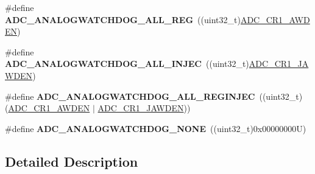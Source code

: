 \begin{DoxyCompactItemize}
\item 
\mbox{\label{group___a_d_c__analog__watchdog__selection_gad9d25140644089dd34084cb4dfa7ebd8}} 
\#define {\bfseries A\+D\+C\+\_\+\+A\+N\+A\+L\+O\+G\+W\+A\+T\+C\+H\+D\+O\+G\+\_\+\+A\+L\+L\+\_\+\+R\+EG}~((uint32\+\_\+t)\mbox{\hyperlink{group___peripheral___registers___bits___definition_ga6e006d43fcb9fe1306745c95a1bdd651}{A\+D\+C\+\_\+\+C\+R1\+\_\+\+A\+W\+D\+EN}})
\item 
\mbox{\label{group___a_d_c__analog__watchdog__selection_gacf2ee0d67e728fd6258270b239823713}} 
\#define {\bfseries A\+D\+C\+\_\+\+A\+N\+A\+L\+O\+G\+W\+A\+T\+C\+H\+D\+O\+G\+\_\+\+A\+L\+L\+\_\+\+I\+N\+J\+EC}~((uint32\+\_\+t)\mbox{\hyperlink{group___peripheral___registers___bits___definition_ga4886de74bcd3a1e545094089f76fd0b3}{A\+D\+C\+\_\+\+C\+R1\+\_\+\+J\+A\+W\+D\+EN}})
\item 
\mbox{\label{group___a_d_c__analog__watchdog__selection_ga8ab72f0e7dfee943acb5cccacff7e4a0}} 
\#define {\bfseries A\+D\+C\+\_\+\+A\+N\+A\+L\+O\+G\+W\+A\+T\+C\+H\+D\+O\+G\+\_\+\+A\+L\+L\+\_\+\+R\+E\+G\+I\+N\+J\+EC}~((uint32\+\_\+t)(\mbox{\hyperlink{group___peripheral___registers___bits___definition_ga6e006d43fcb9fe1306745c95a1bdd651}{A\+D\+C\+\_\+\+C\+R1\+\_\+\+A\+W\+D\+EN}} $\vert$ \mbox{\hyperlink{group___peripheral___registers___bits___definition_ga4886de74bcd3a1e545094089f76fd0b3}{A\+D\+C\+\_\+\+C\+R1\+\_\+\+J\+A\+W\+D\+EN}}))
\item 
\mbox{\label{group___a_d_c__analog__watchdog__selection_gad173f9dd01d4585c9b7c8c324de399c0}} 
\#define {\bfseries A\+D\+C\+\_\+\+A\+N\+A\+L\+O\+G\+W\+A\+T\+C\+H\+D\+O\+G\+\_\+\+N\+O\+NE}~((uint32\+\_\+t)0x00000000\+U)
\end{DoxyCompactItemize}


\subsection{Detailed Description}
